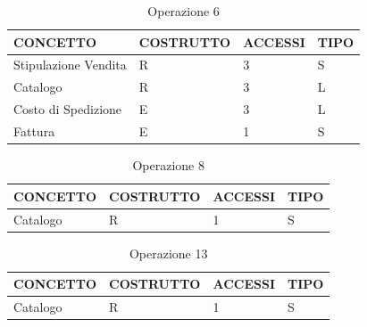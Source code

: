 \begin{table}[H]
\centering
\caption{Operazione 6}
\begin{tabular}{llll}
\\ \hline
\multicolumn{1}{|l|}{\textbf{CONCETTO}} & \multicolumn{1}{l|}{\textbf{COSTRUTTO}} & \multicolumn{1}{l|}{\textbf{ACCESSI}} & \multicolumn{1}{l|}{\textbf{TIPO}} \\ \hline
\multicolumn{1}{|l|}{Stipulazione Vendita}
& \multicolumn{1}{l|}{R}                  & \multicolumn{1}{l|}{3}                & \multicolumn{1}{l|}{S}             \\ \hline
\multicolumn{1}{|l|}{Catalogo}             & \multicolumn{1}{l|}{R}                  & \multicolumn{1}{l|}{3}        
& \multicolumn{1}{l|}{L}             
			 \\ \hline
\multicolumn{1}{|l|}{Costo di Spedizione}     & \multicolumn{1}{l|}{E}                  & \multicolumn{1}{l|}{3}      & \multicolumn{1}{l|}{L}             
			 \\ \hline
\multicolumn{1}{|l|}{Fattura}
& \multicolumn{1}{l|}{E}                  & \multicolumn{1}{l|}{1}                & \multicolumn{1}{l|}{S}             \\ \hline
\end{tabular}
\end{table}

\begin{table}[H]
\centering
\caption{Operazione 8}
\begin{tabular}{llll}
\\ \hline
\multicolumn{1}{|l|}{\textbf{CONCETTO}} & \multicolumn{1}{l|}{\textbf{COSTRUTTO}} & \multicolumn{1}{l|}{\textbf{ACCESSI}} & \multicolumn{1}{l|}{\textbf{TIPO}} \\ \hline
\multicolumn{1}{|l|}{Catalogo}
& \multicolumn{1}{l|}{R}                  & \multicolumn{1}{l|}{1}                & \multicolumn{1}{l|}{S}             \\ \hline
\end{tabular}
\end{table}

\begin{table}[H]
\centering
\caption{Operazione 13}
\begin{tabular}{llll}
\\ \hline
\multicolumn{1}{|l|}{\textbf{CONCETTO}} & \multicolumn{1}{l|}{\textbf{COSTRUTTO}} & \multicolumn{1}{l|}{\textbf{ACCESSI}} & \multicolumn{1}{l|}{\textbf{TIPO}} \\ \hline
\multicolumn{1}{|l|}{Catalogo}
& \multicolumn{1}{l|}{R}                  & \multicolumn{1}{l|}{1}                & \multicolumn{1}{l|}{S}             \\ \hline
\end{tabular}
\end{table}


